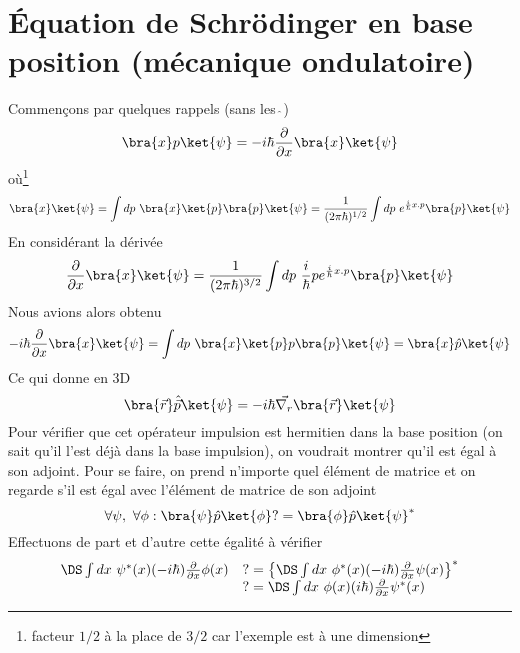 	

\section{Équation de Schrödinger en base position (mécanique ondulatoire)}
Commençons par quelques rappels (sans les $\hat{\ }$)
\begin{equation}
\bra{x}p\ket{\psi} = -i\hbar \frac{\partial}{\partial x}\bra{x}\ket{\psi}
\end{equation}
où\footnote{facteur $1/2$ à la place de $3/2$ car l'exemple est à une dimension}
\begin{equation}
\bra{x}\ket{\psi} = \int dp\ \bra{x}\ket{p}\bra{p}\ket{\psi} = \frac{1}{(2\pi\hbar)^{1/2}}
\int dp\ e^{\frac{i}{\hbar}x.p}\bra{p}\ket{\psi}
\end{equation}
En considérant la dérivée
\begin{equation}
\frac{\partial}{\partial x}\bra{x}\ket{\psi} = \frac{1}{(2\pi\hbar)^{3/2}}\int dp\ \frac{i}{\hbar}p
e^{\frac{i}{\hbar}x.p}\bra{p}\ket{\psi}
\end{equation}
Nous avions alors obtenu
\begin{equation}
-i\hbar\frac{\partial}{\partial x}\bra{x}\ket{\psi} = \int dp\ \bra{x}\ket{p}p\bra{p}\ket{\psi} = 
\bra{x}\hat{p}\ket{\psi}
\end{equation}
Ce qui donne en 3D
\begin{equation}
\bra{\vec{r}}\hat{\vec{p}}\ket{\psi} = -i\hbar\vec{\nabla_r}\bra{\vec{r}}\ket{\psi}
\end{equation}
Pour vérifier que cet opérateur impulsion est hermitien dans la base position (on sait qu'il
l'est déjà dans la base impulsion), on voudrait montrer qu'il est égal à son 
adjoint. Pour se faire, on prend n'importe quel élément de matrice et on regarde s'il est égal avec
l'élément de matrice de son adjoint
\begin{equation}
\forall\psi,\ \forall \phi : \bra{\psi}\hat{p}\ket{\phi} ?= \bra{\phi}\hat{p}\ket{\psi}^*
\end{equation}
Effectuons de part et d'autre cette égalité à vérifier
\begin{equation}
\begin{array}{ll}
\DS \int dx\ \psi^*(x)(-i\hbar)\frac{\partial}{\partial x}\phi(x) &?= \left\{\DS \int dx\ \phi^*(x)(-i\hbar)
\frac{\partial}{\partial x}\psi(x)\right\}^*\\
&?=\DS \int dx\ \phi(x)(i\hbar)\frac{\partial}{\partial x}\psi^*(x)
\end{array}
\end{equation}
